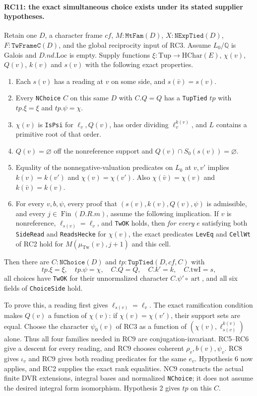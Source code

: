 \paragraph{RC11: the exact simultaneous choice exists under its stated supplier hypotheses.}
Retain one $D$, a character frame $cf$, $M:\texttt{MtFam}(D)$,
$X:\texttt{NExpTied}(D)$, $F:\texttt{TwFrameC}(D)$, and the global
reciprocity input of RC3. Assume $L_0/\mathbb Q$ is Galois and
$D.nd.\mathrm{Loc}$ is empty. Supply functions
$\xi:\mathrm{Tup}\to\mathrm{HChar}(E)$,
$\chi(v)$, $Q(v)$, $k(v)$ and $s(v)$ with the following exact properties.

\begin{enumerate}
\item Each $s(v)$ has a reading at $v$ on some side, and
$s(\bar v)=s(v)$.
\item Every \texttt{NChoice} $C$ on this same $D$ with $C.Q=Q$
has a \texttt{TupTied} $tp$ with $tp.\xi=\xi$ and $tp.\psi=\chi$.
\item $\chi(v)$ is \texttt{IsPsi} for $\ell_v,Q(v)$, has order dividing
$\ell_v^{k(v)}$, and $L$ contains a primitive root of that order.
\item $Q(v)=\varnothing$ off the nonreference support and
$Q(v)\cap S_0(s(v))=\varnothing$.
\item Equality of the nonnegative-valuation predicates on $L_0$
at $v,v'$ implies $k(v)=k(v')$ and $\chi(v)=\chi(v')$.
Also $\chi(\bar v)=\chi(v)$ and $k(\bar v)=k(v)$.
\item For every $v,b,\psi$, every proof that $(s(v),k(v),Q(v),\psi)$
is admissible, and every $j\in\operatorname{Fin}(D.R.m)$, assume the
following implication. If $v$ is nonreference, $\ell_{s(v)}=\ell_v$,
and \texttt{TwOK} holds, then \emph{for every} $e$ satisfying both
\texttt{SideRead} and \texttt{ReadsHecke} for $\chi(v)$,
the exact predicates \texttt{LevEq} and \texttt{CellWt} of RC2 hold
for $M(\mu_{\mathrm{Tw}}(v),j+1)$ and this cell.
\end{enumerate}

Then there are $C:\texttt{NChoice}(D)$ and
$tp:\texttt{TupTied}(D,cf,C)$ with
\[
 tp.\xi=\xi,\quad tp.\psi=\chi,\quad C.Q=Q,\quad C.k'=k,
 \quad C.\mathrm{twI}=s,                                \tag{RC.13}
\]
all choices have \texttt{TwOK} for their unnormalized character
$C.\psi'\circ\operatorname{art}$, and all six fields of
\texttt{ChoiceSide} hold.

To prove this, a reading first gives $\ell_{s(v)}=\ell_v$.
The exact ramification condition makes $Q(v)$ a function of $\chi(v)$:
if $\chi(v)=\chi(v')$, their support sets are equal. Choose the character
$\psi_0(v)$ of RC3 as a function of
$(\chi(v),\ell_{s(v)}^{k(v)})$ alone. Thus all four families needed
in RC9 are conjugation-invariant. RC5--RC6 give a descent for every
reading, and RC9 chooses coherent $\rho_v,b(v),\psi_v$.
RC8 gives $\iota_v$ and RC9 gives both reading predicates for the
same $e_v$. Hypothesis 6 now applies, and RC2 supplies the exact rank
equalities. NC9 constructs the actual finite DVR extensions,
integral bases and normalized \texttt{NChoice}; it does not assume the
desired integral form isomorphism. Hypothesis 2 gives $tp$ on this $C$.

